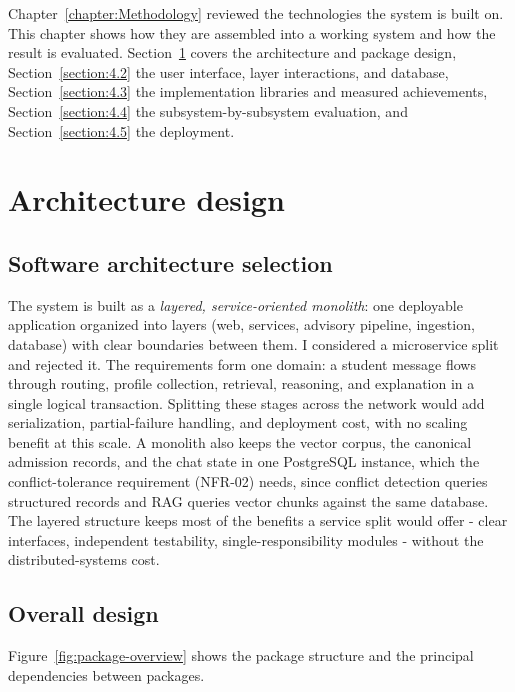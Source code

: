 \documentclass[../main.tex]{subfiles}
\begin{document}

Chapter~\ref{chapter:Methodology} reviewed the technologies the system is built on.
This chapter shows how they are assembled into a working system and how the result is evaluated.
Section~\ref{section:4.1} covers the architecture and package design, Section~\ref{section:4.2} the user interface, layer interactions, and database, Section~\ref{section:4.3} the implementation libraries and measured achievements, Section~\ref{section:4.4} the subsystem-by-subsystem evaluation, and Section~\ref{section:4.5} the deployment.

\section{Architecture design}
\label{section:4.1}

\subsection{Software architecture selection}

The system is built as a \textit{layered, service-oriented monolith}: one deployable application organized into layers (web, services, advisory pipeline, ingestion, database) with clear boundaries between them.
I considered a microservice split and rejected it.
The requirements form one domain: a student message flows through routing, profile collection, retrieval, reasoning, and explanation in a single logical transaction.
Splitting these stages across the network would add serialization, partial-failure handling, and deployment cost, with no scaling benefit at this scale.
A monolith also keeps the vector corpus, the canonical admission records, and the chat state in one PostgreSQL instance, which the conflict-tolerance requirement (NFR-02) needs, since conflict detection queries structured records and \gls{RAG} queries vector chunks against the same database.
The layered structure keeps most of the benefits a service split would offer - clear interfaces, independent testability, single-responsibility modules - without the distributed-systems cost.

\subsection{Overall design}

Figure~\ref{fig:package-overview} shows the package structure and the principal dependencies between packages.
\end{document}
